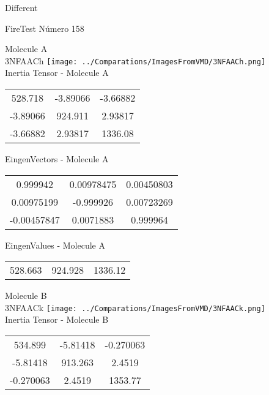 \begin{center}
\vtab
\vtab
\textcolor{NavyBlue}{\Large Different}
\end{center}

 \newpage

\vtab[-2cm]
\begin{center}
{\large FireTest \tab Número 158}
\end{center}
\begin{multicols}{2}
\begin{center}

Molecule A \\ 
3NFAACh
\texttt{[image: ../Comparations/ImagesFromVMD/3NFAACh.png]}
\\
Inertia Tensor - Molecule A \\
\vtab

\begin{tabular}{|c c c|}
528.718	 & 	-3.89066	 & 	-3.66882	 \\
-3.89066	 & 	924.911	 & 	2.93817	 \\
-3.66882	 & 	2.93817	 & 	1336.08
\end{tabular}

\vtab
 EingenVectors - Molecule A     \\
\vtab
\begin{tabular}{|c c c|}
0.999942	 & 	0.00978475	 & 	0.00450803	 \\
0.00975199	 & 	-0.999926	 & 	0.00723269	 \\
-0.00457847	 & 	0.0071883	 & 	0.999964
\end{tabular}

\vtab
 EingenValues - Molecule A     \\
\vtab
\begin{tabular}{|c c c|}
528.663	 & 	924.928	 & 	1336.12	 \\
\end{tabular}
\columnbreak

Molecule B \\ 
3NFAACk
\texttt{[image: ../Comparations/ImagesFromVMD/3NFAACk.png]}
\\
Inertia Tensor - Molecule B \\
\vtab

\begin{tabular}{|c c c|}
534.899	 & 	-5.81418	 & 	-0.270063	 \\
-5.81418	 & 	913.263	 & 	2.4519	 \\
-0.270063	 & 	2.4519	 & 	1353.77
\end{tabular}


\end{center}
\end{multicols}
